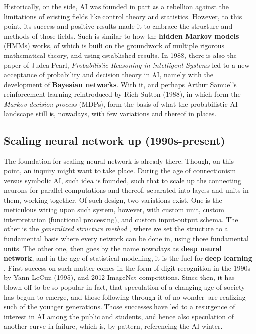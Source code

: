Historically, on the side, AI was founded in part as a rebellion against the limitations of existing fields like control theory and statistics. However, to this point, its success and positive results made it to embrace the structure and methods of those fields. Such is similar to how the \textbf{hidden Markov models}  (HMMs) works, of which is built on the groundwork of multiple rigorous mathematical theory, and using established results. In 1988, there is also the paper of Judea Pearl, \textit{Probabilistic Reasoning in Intelligent Systems} led to a new acceptance of probability and decision theory in AI, namely with the development of \textbf{Bayesian networks}. With it, and perhaps Arthur Samuel's reinforcement learning reintroduced by Rich Sutton (1988), in which form the \textit{Markov decision process} (MDPs), form the basis of what the probabilistic AI landscape still is, nowadays, with few variations and thereof in places. 

\subsection{Scaling neural network up (1990s-present)}

The foundation for scaling neural network is already there. Though, on this point, an inquiry might want to take place. During the age of connectionism versus symbolic AI, such idea is founded, such that to scale up the connecting neurons for parallel computations and thereof, separated into layers and units in them, working together. Of such design, two variations exist. One is the meticulous wiring upon such system, however, with custom unit, custom interpretation (functional processing), and custom input-output schema. The other is the \textit{generalized structure method} , where we set the structure to a fundamental basis where every network can be done in, using those fundamental units. The other one, then goes by the name nowadays as \textbf{deep neural network}, and in the age of statistical modelling, it is the fuel for \textbf{deep learning} . First success on such matter comes in the form of digit recognition in the 1990s by Yann LeCun (1995), and 2012 ImageNet competitions. Since then, it has blown off to be so popular in fact, that speculation of a changing age of society has begun to emerge, and those following through it of no wonder, are realizing such of the younger generations. Those successes have led to a resurgence of interest in AI among the public and students, and hence also speculation of another curve in failure, which is, by pattern, referencing the AI winter. 

